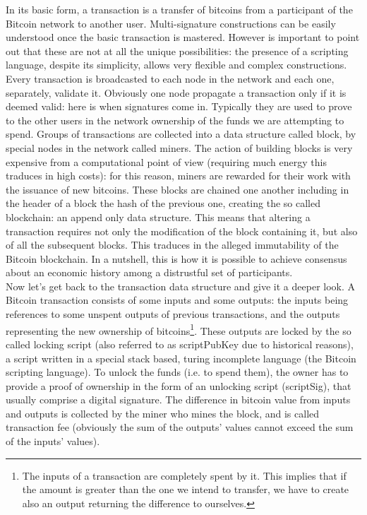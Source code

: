 \bigskip
\noindent
In its basic form, a transaction is a transfer of bitcoins from a participant of the Bitcoin network to another user. Multi-signature constructions can be easily understood once the basic transaction is mastered. However is important to point out that these are not at all the unique possibilities: the presence of a scripting language, despite its simplicity, allows very flexible and complex constructions. Every transaction is broadcasted to each node in the network and each one, separately, validate it. Obviously one node propagate a transaction only if it is deemed valid: here is when signatures come in. Typically they are used to prove to the other users in the network ownership of the funds we are attempting to spend. Groups of transactions are collected into a data structure called block, by special nodes in the network called miners. The action of building blocks is very expensive from a computational point of view (requiring much energy this traduces in high costs): for this reason, miners are rewarded for their work with the issuance of new bitcoins. These blocks are chained one another including in the header of a block the hash of the previous one, creating the so called blockchain: an append only data structure. This means that altering a transaction requires not only the modification of the block containing it, but also of all the subsequent blocks. This traduces in the alleged immutability of the Bitcoin blockchain. In a nutshell, this is how it is possible to achieve consensus about an economic history among a distrustful set of participants.
\\
Now let's get back to the transaction data structure and give it a deeper look. A Bitcoin transaction consists of some inputs and some outputs: the inputs being references to some unspent outputs of previous transactions, and the outputs representing the new ownership of bitcoins\footnote{The inputs of a transaction are completely spent by it. This implies that if the amount is greater than the one we intend to transfer, we have to create also an output returning the difference to ourselves.}. These outputs are locked by the so called locking script (also referred to as scriptPubKey due to historical reasons), a script written in a special stack based, turing incomplete language (the Bitcoin scripting language). To unlock the funds (i.e. to spend them), the owner has to provide a proof of ownership in the form of an unlocking script (scriptSig), that usually comprise a digital signature. The difference in bitcoin value from inputs and outputs is collected by the miner who mines the block, and is called transaction fee (obviously the sum of the outputs' values cannot exceed the sum of the inputs' values).
